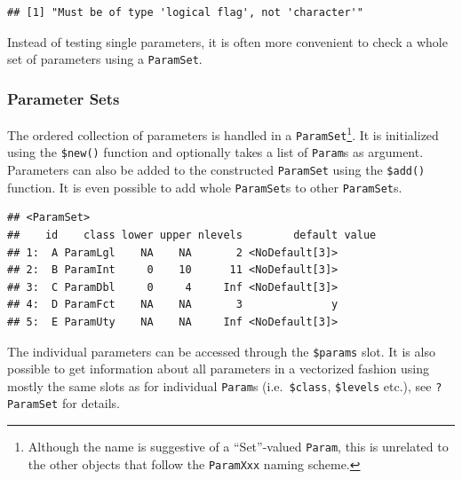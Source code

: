 \documentclass[
]{scrbook}
\newenvironment{Shaded}{\begin{snugshade}}{\end{snugshade}}
\newcommand{\FunctionTok}[1]{\textcolor[rgb]{0.00,0.00,0.00}{#1}}
\newcommand{\NormalTok}[1]{#1}
\newcommand{\OtherTok}[1]{\textcolor[rgb]{0.56,0.35,0.01}{#1}}
\newcommand{\SpecialCharTok}[1]{\textcolor[rgb]{0.00,0.00,0.00}{#1}}
\renewenvironment{Shaded} {\begin{snugshade}\small} {\end{snugshade}}
\begin{document}
\begin{verbatim}
## [1] "Must be of type 'logical flag', not 'character'"
\end{verbatim}

Instead of testing single parameters, it is often more convenient to check a whole set of parameters using a \texttt{ParamSet}.

\hypertarget{parameter-sets}{%
\subsubsection{Parameter Sets}\label{parameter-sets}}

The ordered collection of parameters is handled in a \texttt{ParamSet}\footnote{Although the name is suggestive of a ``Set''-valued \texttt{Param}, this is unrelated to the other objects that follow the \texttt{ParamXxx} naming scheme.}.
It is initialized using the \texttt{\$new()} function and optionally takes a list of \texttt{Param}s as argument.
Parameters can also be added to the constructed \texttt{ParamSet} using the \texttt{\$add()} function.
It is even possible to add whole \texttt{ParamSet}s to other \texttt{ParamSet}s.

\begin{Shaded}
\end{Shaded}

\begin{verbatim}
## <ParamSet>
##    id    class lower upper nlevels        default value
## 1:  A ParamLgl    NA    NA       2 <NoDefault[3]>      
## 2:  B ParamInt     0    10      11 <NoDefault[3]>      
## 3:  C ParamDbl     0     4     Inf <NoDefault[3]>      
## 4:  D ParamFct    NA    NA       3              y      
## 5:  E ParamUty    NA    NA     Inf <NoDefault[3]>
\end{verbatim}

The individual parameters can be accessed through the \texttt{\$params} slot.
It is also possible to get information about all parameters in a vectorized fashion using mostly the same slots as for individual \texttt{Param}s (i.e.~\texttt{\$class}, \texttt{\$levels} etc.), see \texttt{?ParamSet} for details.
\end{document}
